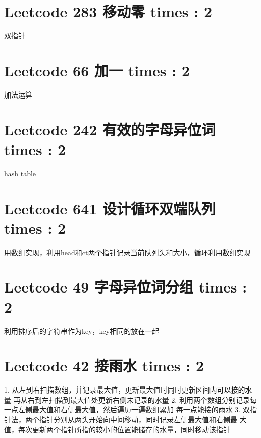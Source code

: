 \documentclass[UTF8]{ctexart}
\begin{document}
\section{Leetcode 283 移动零 times : 2}
双指针

\section{Leetcode 66 加一 times : 2}
加法运算

\section{Leetcode 242 有效的字母异位词 times : 2}
hash table

\section{Leetcode 641 设计循环双端队列 times : 2}
用数组实现，利用head和ct两个指针记录当前队列头和大小，循环利用数组实现

\section{Leetcode 49 字母异位词分组 times : 2}
利用排序后的字符串作为key，key相同的放在一起

\section{Leetcode 42 接雨水 times : 2}
1. 从左到右扫描数组，并记录最大值，更新最大值时同时更新区间内可以接的水量
再从右到左扫描到最大值处更新右侧未记录的水量
2. 利用两个数组分别记录每一点左侧最大值和右侧最大值，然后遍历一遍数组累加
每一点能接的雨水
3. 双指针法，两个指针分别从两头开始向中间移动，同时记录左侧最大值和右侧最
大值，每次更新两个指针所指的较小的位置能储存的水量，同时移动该指针
\end{document}
